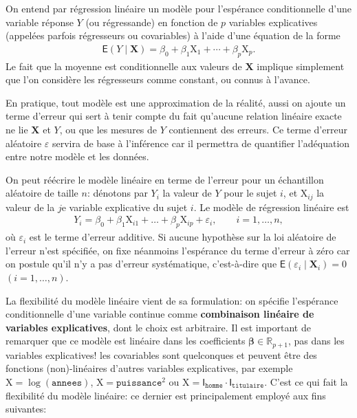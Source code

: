 \documentclass[
  11pt,
  letterpaper,
]{article}
\theoremstyle{definition}
\theoremstyle{definition}
\theoremstyle{definition}
\theoremstyle{remark}
\begin{document}
On entend par régression linéaire un modèle pour l'espérance conditionnelle d'une variable réponse \(Y\) (ou régressande) en fonction de \(p\) variables explicatives (appelées parfois régresseurs ou covariables) à l'aide d'une équation de la forme
\begin{align*}
\mathsf{E}(Y \mid \mathbf{X})=\beta_0 + \beta_1\mathrm{X}_{1} + \cdots + \beta_p \mathrm{X}_{p}.
\end{align*}
Le fait que la moyenne est conditionnelle aux valeurs de \(\mathbf{X}\) implique simplement que l'on considère les régresseurs comme constant, ou connus à l'avance.

En pratique, tout modèle est une approximation de la réalité, aussi on ajoute un terme d'erreur qui sert à tenir compte du fait qu'aucune relation linéaire exacte ne lie \(\mathbf{X}\) et \(Y\), ou que les mesures de \(Y\) contiennent des erreurs. Ce terme d'erreur aléatoire \(\varepsilon\) servira de base à l'inférence car il permettra de quantifier l'adéquation entre notre modèle et les données.

On peut réécrire le modèle linéaire en terme de l'erreur pour un échantillon aléatoire de taille \(n\): dénotons par \(Y_i\) la valeur de \(Y\) pour le sujet \(i\), et \(\mathrm{X}_{ij}\) la valeur de la \(j\)e variable explicative du sujet \(i\). Le modèle de régression linéaire est
\begin{align}
Y_i = \beta_0 + \beta_1 \mathrm{X}_{i1} + \ldots + \beta_p \mathrm{X}_{ip} +\varepsilon_{i}, \qquad i =1, \ldots, n, \label{eq:olsmean}
\end{align}
où \(\varepsilon_i\) est le terme d'erreur additive. Si aucune hypothèse sur la loi aléatoire de l'erreur n'est spécifiée, on fixe néanmoins l'espérance du terme d'erreur à zéro car on postule qu'il n'y a pas d'erreur systématique, c'est-à-dire que \(\mathsf{E}(\varepsilon_i \mid \boldsymbol{X}_i)=0\) \((i=1, \ldots, n)\).

La flexibilité du modèle linéaire vient de sa formulation: on spécifie l'espérance conditionnelle d'une variable continue comme \textbf{combinaison linéaire de variables explicatives}, dont le choix est arbitraire.
Il est important de remarquer que ce modèle est linéaire dans les coefficients \(\boldsymbol{\beta}\in \mathbb{R}_{p+1}\), pas dans les variables explicatives! les covariables sont quelconques et peuvent être des fonctions (non)-linéaires d'autres variables explicatives, par exemple \(\mathrm{X}=\log(\texttt{annees})\), \(\mathrm{X}=\texttt{puissance}^2\) ou \(\mathrm{X}= \mathsf{I}_{\texttt{homme}}\cdot\mathsf{I}_{\texttt{titulaire}}\). C'est ce qui fait la flexibilité du modèle linéaire: ce dernier est principalement employé aux fins suivantes:
\end{document}
